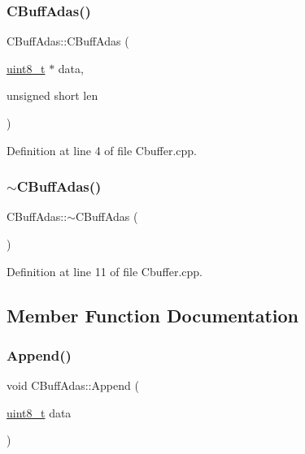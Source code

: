 \subsubsection{\texorpdfstring{CBuffAdas()}{CBuffAdas()}}
{\footnotesize\ttfamily C\+Buff\+Adas\+::\+C\+Buff\+Adas (\begin{DoxyParamCaption}\item[{\mbox{\hyperlink{_a_d_a_s___types_8h_aba7bc1797add20fe3efdf37ced1182c5}{uint8\+\_\+t}} $\ast$}]{data,  }\item[{unsigned short}]{len }\end{DoxyParamCaption})}



Definition at line 4 of file Cbuffer.\+cpp.

\mbox{\label{class_c_buff_adas_a55af513577ba8522492fff4db85da247}} 
\subsubsection{\texorpdfstring{$\sim$CBuffAdas()}{~CBuffAdas()}}
{\footnotesize\ttfamily C\+Buff\+Adas\+::$\sim$\+C\+Buff\+Adas (\begin{DoxyParamCaption}{ }\end{DoxyParamCaption})}



Definition at line 11 of file Cbuffer.\+cpp.



\subsection{Member Function Documentation}
\mbox{\label{class_c_buff_adas_ad131824caddc2ee1b90a629e4c30f215}} 
\subsubsection{\texorpdfstring{Append()}{Append()}}
{\footnotesize\ttfamily void C\+Buff\+Adas\+::\+Append (\begin{DoxyParamCaption}\item[{\mbox{\hyperlink{_a_d_a_s___types_8h_aba7bc1797add20fe3efdf37ced1182c5}{uint8\+\_\+t}}}]{data }\end{DoxyParamCaption})}



